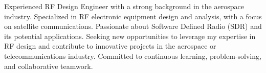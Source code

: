 \documentclass[10pt,a4paper]{altacv}
\begin{document}


\begin{fullwidth}
    \makecvheader
\end{fullwidth}



\justifying
Experienced RF Design Engineer with a strong background in the aerospace industry. Specialized in RF electronic equipment design and analysis, with a focus on satellite communications. Passionate about Software Defined Radio (SDR) and its potential applications. Seeking new opportunities to leverage my expertise in RF design and contribute to innovative projects in the aerospace or telecommunications industry. Committed to continuous learning, problem-solving, and collaborative teamwork.



\end{document}
